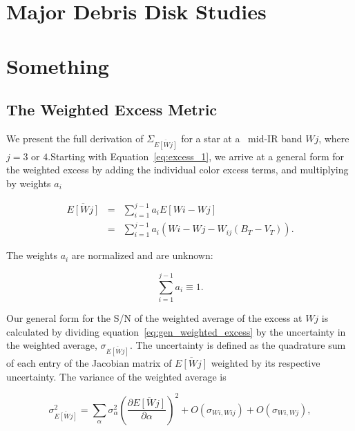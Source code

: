 


\chapter{Major Debris Disk Studies}




\chapter{Something}

\section{The Weighted Excess Metric}
\label{sec:appendix}


We present the full derivation of $\Sigma_{\overline{E[Wj]}}$ for a star at a \WS\ mid-IR band $Wj$, where $j=3\mbox{ or }4$.Starting with Equation~\ref{eq:excess_1}, we arrive at a general form for the weighted excess by adding the individual color excess terms, and multiplying by weights $a_i$

\begin{eqnarray}%
\overline{E[Wj]} &=&  \sum_{i=1}^{j-1} a_i E[Wi-Wj]\label{eq:gen_weighted_excess}\\
                 &=& \sum_{i=1}^{j-1} a_i\left(Wi-Wj-W_{ij}(B_T-V_T)\right)\label{eq:gen_weighted_excess2}.
\end{eqnarray}

\noindent The weights $a_i$ are normalized and are unknown:

\begin{equation}\label{eq:sum_weights}
\sum_{i=1}^{j-1} a_i \equiv 1. 
\end{equation}

\noindent Our general form for the S/N of the weighted average of the excess at $Wj$ is calculated by dividing equation~\ref{eq:gen_weighted_excess} by the uncertainty in the weighted average, $\sigma_{\overline{E[Wj]}}$. The uncertainty is defined as the quadrature sum of each entry of the Jacobian matrix of $\overline{E[Wj]}$ weighted by its respective uncertainty. The variance of the weighted average is

\begin{equation}\label{eq:wtavgExcessUnc}
      \sigma_{\overline{E[Wj]}}^2 = \sum_{\alpha} \sigma_{\alpha}^2 \left(\frac{\partial \overline{E[Wj]}}{\partial \alpha}\right)^2 + O\left(\sigma_{Wi,Wij} \right) + O(\sigma_{Wi,Wj}),
\end{equation}

